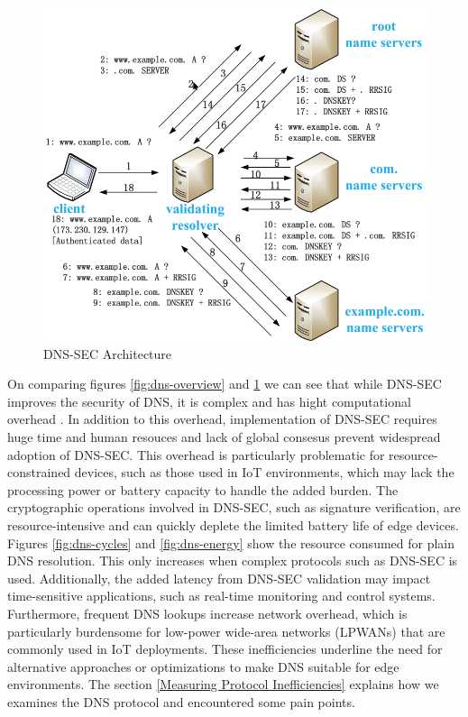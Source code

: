 \documentclass[conference]{IEEEtran}
\begin{document}
\begin{figure}[htbp]
    \centering
    \includegraphics[width=0.9\linewidth]{images/dnssec-overview.png}
    \caption{DNS-SEC Architecture \cite{8653281}}
    \label{fig:DNS-SEC-overview}
\end{figure}

On comparing figures \ref{fig:dns-overview} and \ref{fig:DNS-SEC-overview} we can see that while DNS-SEC improves the security of DNS, it is complex and has hight computational overhead \cite{8653281}. In addition to this overhead, implementation of DNS-SEC requires huge time and human resouces and lack of global consesus \cite{polo-2022} prevent widespread adoption of DNS-SEC. This overhead is particularly problematic for resource-constrained devices, such as those used in IoT environments, which may lack the processing power or battery capacity to handle the added burden. The cryptographic operations involved in DNS-SEC, such as signature verification, are resource-intensive and can quickly deplete the limited battery life of edge devices. Figures \ref{fig:dns-cycles} and \ref{fig:dns-energy} show the resource consumed for plain DNS resolution. This only increases when complex protocols such as DNS-SEC is used. Additionally, the added latency from DNS-SEC validation may impact time-sensitive applications, such as real-time monitoring and control systems. Furthermore, frequent DNS lookups increase network overhead, which is particularly burdensome for low-power wide-area networks (LPWANs) that are commonly used in IoT deployments. These inefficiencies underline the need for alternative approaches or optimizations to make DNS suitable for edge environments. The section \ref{Measuring Protocol Inefficiencies} explains how we examines the DNS protocol and encountered some pain points.
\end{document}
